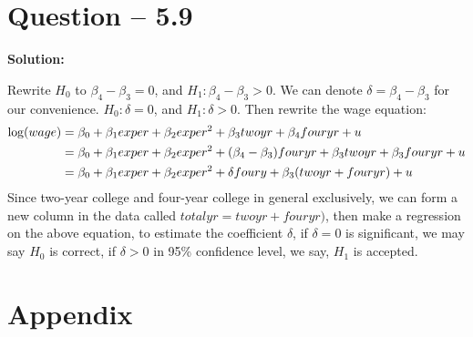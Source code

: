 \documentclass[11pt]{article} %
\begin{document}
\section{Question -- 5.9}
\textbf{Solution:}

Rewrite $H_0$ to $\beta_4-\beta_3=0$, and $H_1: \beta_4-\beta_3>0$. We can denote $\delta=\beta_4-\beta_3$ for our convenience. $H_0: \delta=0$, and $H_1: \delta>0$.
Then rewrite the wage equation:
\begin{align}
   \log(wage)&=\beta_0+\beta_1 exper+\beta_2 exper^2 + \beta_3 twoyr+\beta_4 fouryr+u \notag\\
            &= \beta_0+\beta_1 exper+\beta_2 exper^2+ (\beta_4-\beta_3)fouryr+\beta_3 twoyr+\beta_3fouryr+u\notag \\
            &= \beta_0+\beta_1 exper+\beta_2 exper^2+\delta foury+\beta_3(twoyr+fouryr)+u
\end{align}
Since two-year college and four-year college in general exclusively, we can form a new column in the data called $totalyr=twoyr+fouryr)$, then make a regression on the above equation,
to estimate the coefficient $\delta$, if $\delta =0$ is significant, we may say $H_0$ is correct, if $\delta >0$ in 95\% confidence level, we say, $H_1$ is accepted. 













































\appendix
\setcounter{secnumdepth}{0}
\section{Appendix}
\end{document}
